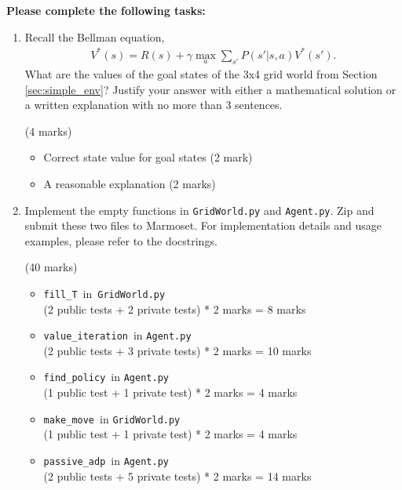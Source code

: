 \documentclass[12pt]{article}
\begin{document}
\textbf{Please complete the following tasks:}
\begin{enumerate}
    \item Recall the Bellman equation,
    \begin{align*}
        V^*(s) = R(s) + \gamma \max_a \sum_{s'} P(s'|s,a)V^*(s').
    \end{align*}
    What are the values of the goal states of the 3x4 grid world from Section \ref{sec:simple_env}? Justify your answer with either a mathematical solution or a written explanation with no more than 3 sentences. 
    \begin{markscheme}
        (4 marks)
        \begin{itemize}
            \item Correct state value for goal states (2 mark)
            \item A reasonable explanation (2 marks)
        \end{itemize}
    \end{markscheme}
    
    \item Implement the empty functions in \texttt{GridWorld.py} and \texttt{Agent.py}. Zip and submit these two files to Marmoset. For implementation details and usage examples, please refer to the docstrings.
    \begin{markscheme}
        (40 marks)
        \begin{itemize}
            \item \texttt{fill\_T}\, in\, \texttt{GridWorld.py}\\
            (2 public tests + 2 private tests) * 2 marks = 8 marks
            \item \texttt{value\_iteration}\, in \texttt{Agent.py}\\ (2 public tests + 3 private tests) * 2 marks = 10 marks
            \item \texttt{find\_policy}\, in \texttt{Agent.py}\\ (1 public test + 1 private test) * 2 marks = 4 marks
             \item \texttt{make\_move}\, in \texttt{GridWorld.py}\\ (1 public test + 1 private test) * 2 marks = 4 marks
            \item \texttt{passive\_adp}\, in \texttt{Agent.py}\\ (2 public tests + 5 private tests) * 2 marks = 14 marks
        \end{itemize}
    \end{markscheme}
    

\end{enumerate}
\end{document}
